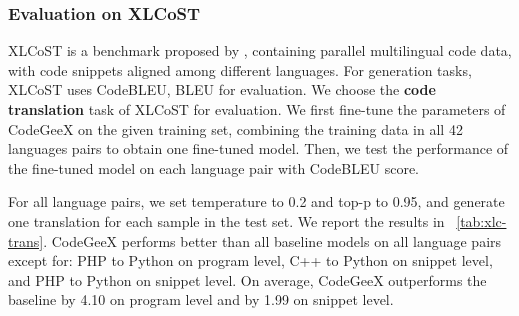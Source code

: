 \subsubsection{Evaluation on XLCoST}
XLCoST is a benchmark proposed by \cite{zhu2022xlcost}, containing parallel multilingual code data, with code snippets aligned among different languages.
For generation tasks, XLCoST uses CodeBLEU, BLEU for evaluation.
We choose the \textbf{code translation} task of XLCoST for \name evaluation. 
We first fine-tune the parameters of CodeGeeX on the given training set, combining the training data in all 42 languages pairs to obtain one fine-tuned model. Then, we test the performance of the fine-tuned model on each language pair with CodeBLEU score.

For all language pairs, we set temperature to 0.2 and top-p to 0.95, and generate one translation for each sample in the test set. 
We report the results in \tableautorefname~\ref{tab:xlc-trans}. 
CodeGeeX performs better than all baseline models on all language pairs except for: PHP to Python on program level, C++ to Python on snippet level, and PHP to Python on snippet level. On average, CodeGeeX outperforms the baseline by 4.10 on program level and by 1.99 on snippet level.

